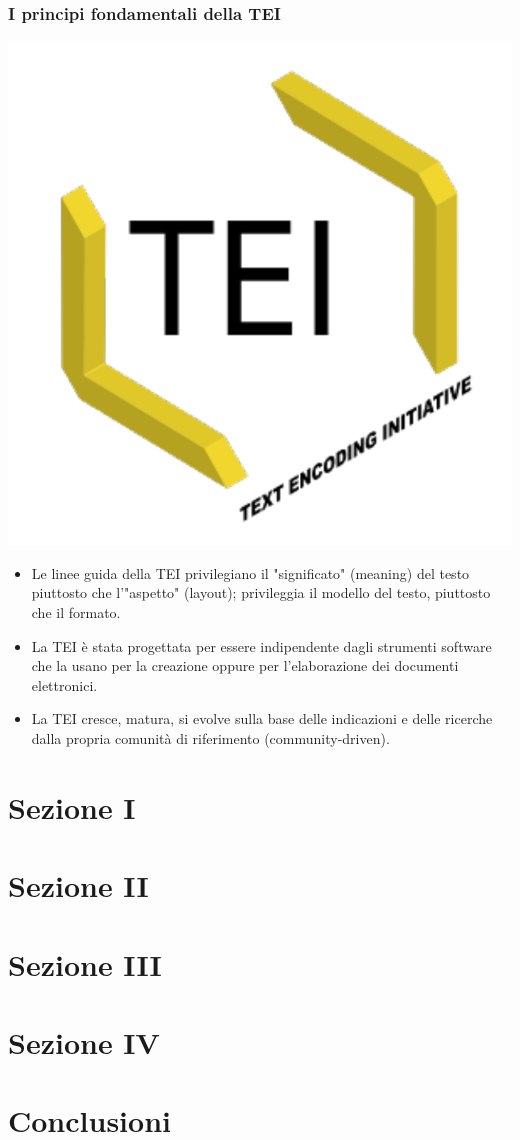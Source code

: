 \documentclass{beamer}
\begin{document}
\begin{frame}
	\frametitle{I principi fondamentali della TEI}
	\addtocounter{nframe}{1}
    
    \begin{center}
	    \includegraphics[width=.2\textwidth]{../imgs/tei-r.pdf}
	\end{center}

    \begin{itemize}
        
        \item<1-> Le linee guida della TEI privilegiano il "significato" (meaning) del testo piuttosto che l'"aspetto" (layout); privileggia il modello del testo, piuttosto che il formato.
          
        \item<2-> La TEI è stata progettata per essere indipendente dagli strumenti software che la usano per la creazione oppure per l'elaborazione dei documenti elettronici.

        \item<3-> La TEI cresce, matura, si evolve sulla base delle indicazioni e delle ricerche dalla propria comunità di riferimento (community-driven).
           
    \end{itemize}
    
\end{frame}

\section{Sezione I}


\section{Sezione II}


\section{Sezione III}


\section{Sezione IV}


\section{Conclusioni}

\end{document}
